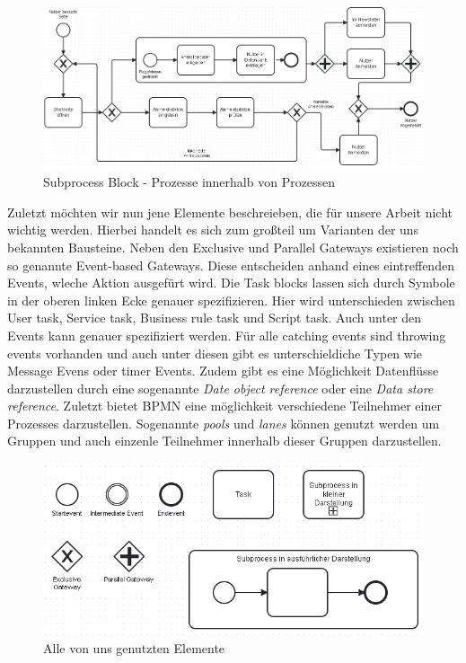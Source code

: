 \begin{figure}
\centering
\includegraphics[scale=0.5]{Figures/Beispiel7}
\decoRule
\caption[Subprocess Block]{Subprocess Block - Prozesse innerhalb von Prozessen}
\label{fig:Task}
\end{figure}

Zuletzt möchten wir nun jene Elemente beschreieben, die für unsere Arbeit nicht wichtig werden. Hierbei handelt es sich zum großteil um Varianten der uns bekannten Bausteine. Neben den Exclusive und Parallel Gateways existieren noch so genannte Event-based Gateways. Diese entscheiden anhand eines eintreffenden Events, wleche Aktion ausgefürt wird. 
Die Task blocks lassen sich durch Symbole in der oberen linken Ecke genauer spezifizieren. Hier wird unterschieden zwischen User task, Service task, Business rule task und Script task. Auch unter den Events kann genauer spezifiziert werden. Für alle catching events sind throwing events vorhanden und auch unter diesen gibt es unterschieldiche Typen wie Message Evens oder timer Events. Zudem gibt es eine Möglichkeit Datenflüsse darzustellen durch eine sogenannte \emph{Date object reference} oder eine \emph{Data store reference}. Zuletzt bietet BPMN eine möglichkeit verschiedene Teilnehmer einer Prozesses darzustellen. Sogenannte \emph{pools} und \emph{lanes} können genutzt werden um Gruppen und auch einzenle Teilnehmer innerhalb dieser Gruppen darzustellen.


\begin{figure}
\centering
\includegraphics[scale=0.5]{Figures/Alleblocke}
\decoRule
\caption[Alle Elemente]{Alle von uns genutzten Elemente}
\label{fig:Task}
\end{figure}


